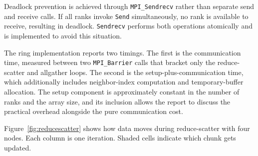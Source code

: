 \documentclass[12pt,a4paper]{article}
\begin{document}
Deadlock prevention is achieved through \texttt{MPI\_Sendrecv} rather than separate send and receive calls. If all ranks invoke \texttt{Send} simultaneously, no rank is available to receive, resulting in deadlock. \texttt{Sendrecv} performs both operations atomically and is implemented to avoid this situation.

The ring implementation reports two timings. The first is the communication time, measured between two \texttt{MPI\_Barrier} calls that bracket only the reduce-scatter and allgather loops. The second is the setup-plus-communication time, which additionally includes neighbor-index computation and temporary-buffer allocation. The setup component is approximately constant in the number of ranks and the array size, and its inclusion allows the report to discuss the practical overhead alongside the pure communication cost.

Figure~\ref{fig:reducescatter} shows how data moves during reduce-scatter with four nodes. Each column is one iteration. Shaded cells indicate which chunk gets updated.
\end{document}
